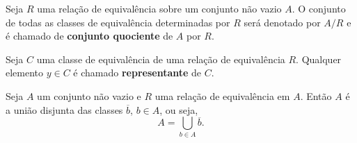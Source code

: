 \documentclass{beamer}
\begin{document}
    \begin{frame}
        \begin{definicao}
            Seja $R$ uma relação de equivalência sobre um conjunto não vazio $A$. \pause O conjunto de todas as classes de equivalência \pause determinadas por $R$ será \pause denotado por $A/R$ \pause e é chamado de \textbf{conjunto quociente} de $A$ por $R$.
        \end{definicao}
    \end{frame}

    \begin{frame}
        \begin{definicao}
            Seja $C$ uma classe de equivalência \pause de uma relação de equivalência $R$. \pause Qualquer elemento $y\in C$ \pause é chamado \textbf{representante} de $C$.\pause
        \end{definicao}

        \begin{proposicao}
            Seja $A$ um conjunto não vazio \pause e $R$ uma relação de equivalência em $A$. \pause Então $A$ é a união disjunta das classes $\overline{b}$, $b \in A$, ou seja,\pause
            \[
                A = \bigcup_{b\in A}\overline{b}.
            \]
        \end{proposicao}
    \end{frame}
\end{document}
